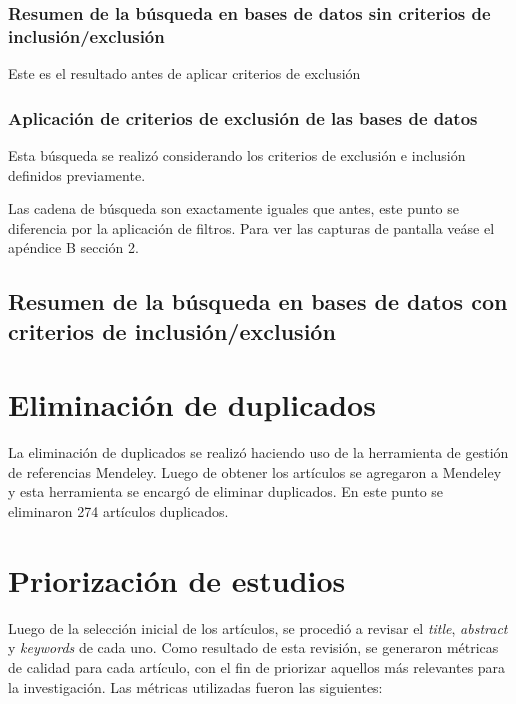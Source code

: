 \subsubsection{Resumen de la búsqueda en bases de datos sin criterios de inclusión/exclusión}\label{subsubsec:resumenBusqueda}
Este es el resultado antes de aplicar criterios de exclusión




\subsubsection{Aplicación de criterios de exclusión de las bases de datos}
Esta búsqueda se realizó considerando los criterios de exclusión e inclusión definidos previamente.

Las cadena de búsqueda son exactamente iguales que antes, este punto se diferencia por la aplicación de 
filtros. Para ver las capturas de pantalla veáse el apéndice B sección 2.

\subsection{Resumen de la búsqueda en bases de datos con criterios de inclusión/exclusión}\label{subsec:resumenBusquedaCriterios}




\section{Eliminación de duplicados}\label{sec:eliminacionDuplicados}
La eliminación de duplicados se realizó haciendo uso de la herramienta de gestión de referencias Mendeley. Luego de obtener los artículos se agregaron a Mendeley y esta herramienta se encargó de eliminar duplicados. En este punto se eliminaron 274 artículos duplicados.

\section{Priorización de estudios}\label{sec:priorizacionEstudios}

Luego de la selección inicial de los artículos, se procedió a revisar el \textit{title}, \textit{abstract} y \textit{keywords} de cada uno. Como resultado de esta revisión, se generaron métricas de calidad para cada artículo, con el fin de priorizar aquellos más relevantes para la investigación. Las métricas utilizadas fueron las siguientes:

